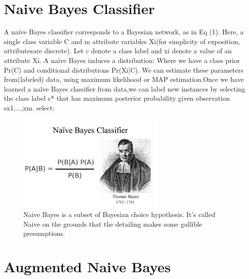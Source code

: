 \documentclass[letterpaper,12pt]{article}
\begin{document}
\section{Naive Bayes Classifier}

A naïve Bayes classifier corresponds to a Bayesian network, as in Eq (1). Here, a single class variable C and m attribute variables Xi(for simplicity of exposition, attributesare discrete). Let c denote a class label and xi denote a value of an attribute Xi. A naïve Bayes induces a distribution:
Where we have a class prior Pr(C) and conditional distributions Pr(Xi|C). We can estimate these parameters from(labeled) data, using maximum likelihood or MAP estimation.Once we have learned a naïve Bayes classifier from data,we can label new instances by selecting the class label c* that has maximum posterior probability given observation sx1,...,xm. select:

\begin{figure}[!h]
    \centering
    \includegraphics[width=.8\textwidth]{images.jpg}
    \caption{Naive Bayes is a subset of Bayesian choice hypothesis. It's called Naive on the grounds that the detailing makes some gullible 
presumptions.}
\end{figure}


\section{Augmented Naive Bayes}
\end{document}
